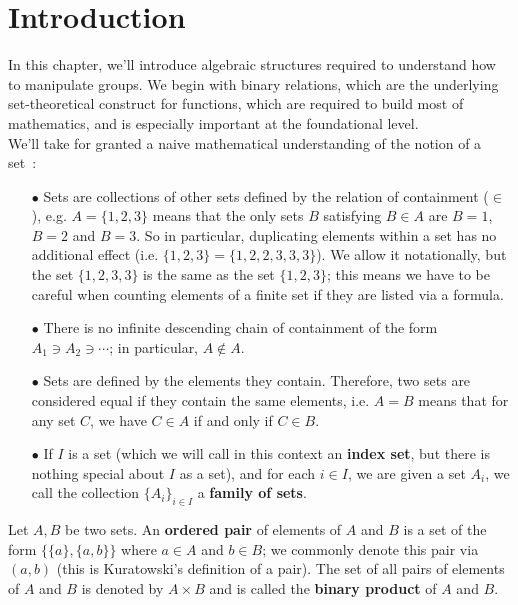 
\section{Introduction}

In this chapter, we'll introduce algebraic structures required to understand how to manipulate groups. We begin with binary relations, which are the underlying set-theoretical construct for functions, which are required to build most of mathematics, and is especially important at the foundational level.
\\

We'll take for granted a naive mathematical understanding of the notion of a set~:
\\

\begin{itemize}
	\item[$\bullet$] Sets are collections of other sets defined by the relation of containment ($\in$), e.g. $A = \{1,2,3\}$ means that the only sets $B$ satisfying $B \in A$ are $B=1$, $B=2$ and $B=3$. So in particular, duplicating elements within a set has no additional effect (i.e. $\{1,2,3\} = \{1,2,2,3,3,3\}$). We allow it notationally, but the set $\{1,2,3,3\}$ is the same as the set $\{1,2,3\}$; this means we have to be careful when counting elements of a finite set if they are listed via a formula.
	\\

	\item[$\bullet$] There is no infinite descending chain of containment of the form $A_1 \ni A_2 \ni \cdots$; in particular, $A \notin A$.
	\\

	\item[$\bullet$] Sets are defined by the elements they contain. Therefore, two sets are considered equal if they contain the same elements, i.e. $A=B$ means that for any set $C$, we have $C \in A$ if and only if $C \in B$. 
	\\

	\item[$\bullet$] If $I$ is a set (which we will call in this context an \textbf{index set}, but there is nothing special about $I$ as a set), and for each $i \in I$, we are given a set $A_i$, we call the collection $\{A_i\}_{i \in I}$ a \textbf{family of sets}.
	\\
\end{itemize}

\begin{definition} \label{binary-product-of-sets}
	Let $A,B$ be two sets. An \textbf{ordered pair} of elements of $A$ and $B$ is a set of the form $\{\{a\}, \{a,b\}\}$ where $a \in A$ and $b \in B$; we commonly denote this pair via $(a,b)$ (this is Kuratowski's definition of a pair). The set of all pairs of elements of $A$ and $B$ is denoted by $A \times B$ and is called the \textbf{binary product} of $A$ and $B$. 
\end{definition}

